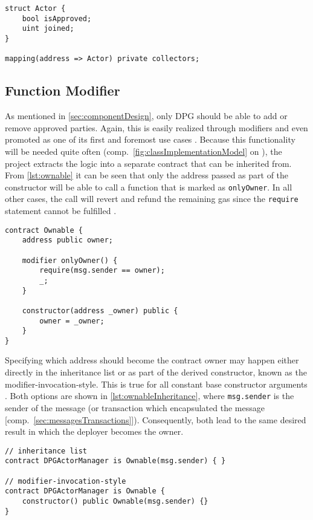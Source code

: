\begin{lstlisting}[language=Solidity, caption=Declaration of approved agencies and Actor data structure, label=lst:actorStorage]
struct Actor {
	bool isApproved;
	uint joined;
}
    
mapping(address => Actor) private collectors;
\end{lstlisting}

\subsection{Function Modifier}
\label{sec:ownable}
As mentioned in \autoref{sec:componentDesign}, only \ac{DPG} should be able to add or remove approved parties. Again, this is easily realized through modifiers and even promoted as one of its first and foremost use cases \cite[p.~80]{solidityDocs}. Because this functionality will be needed quite often (comp.~\autoref{fig:classImplementationModel} on ), the project extracts the logic into a separate contract that can be inherited from. From \autoref{lst:ownable} it can be seen that only the address passed as part of the constructor will be able to call a function that is marked as \texttt{onlyOwner}. In all other cases, the call will revert and refund the remaining gas since the \texttt{require} statement cannot be fulfilled \cite[p.~75]{solidityDocs}. 

\begin{lstlisting}[language=Solidity, caption=Ownable contract, label=lst:ownable]
contract Ownable {
	address public owner;
	
	modifier onlyOwner() {
		require(msg.sender == owner);
		_;
	}
	
	constructor(address _owner) public {
		owner = _owner;
	}
}
\end{lstlisting}

Specifying which address should become the contract owner may happen either directly in the inheritance list or as part of the derived constructor, known as the modifier-invocation-style. This is true for all constant base constructor arguments \cite[p.~89]{solidityDocs}. Both options are shown in \autoref{lst:ownableInheritance}, where \texttt{msg.sender} is the sender of the message (or transaction which encapsulated the message [comp.~\ref{sec:messagesTransactions}]). Consequently, both lead to the same desired result in which the deployer becomes the owner.

\begin{lstlisting}[language=Solidity, caption=Inheriting from Ownable contract, label=lst:ownableInheritance]
// inheritance list
contract DPGActorManager is Ownable(msg.sender) { }

// modifier-invocation-style
contract DPGActorManager is Ownable { 
	constructor() public Ownable(msg.sender) {}
}
\end{lstlisting}

